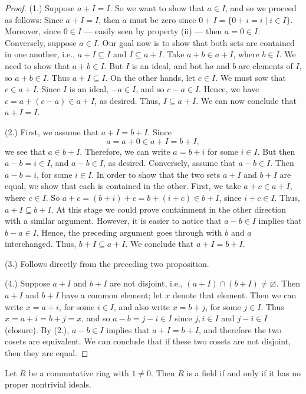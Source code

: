 \documentclass[graybox, reqno]{svmono}
\begin{document}
\begin{proof}
 (1.) Suppose $a+I = I$. So we want to show that $a \in I$, and so we proceed as follows: Since $a + I = I$, then $a$ must be zero since $0+I = \{ 0+ i = i \mid i \in I \}$. Moreover, since $0 \in I$ --- easily seen by property (ii) --- then $a= 0 \in I$. Conversely, suppose $a \in I$. Our goal now is to show that both sets are contained in one another, i.e., $a+I \subseteq I$ and $I \subseteq a + I$. Take $a + b \in a+ I$, where $b \in I$. We need to show that $a+ b \in I$. But $I$ is an ideal, and bot h$a$ and $b$ are elements of $I$, so $a+b \in I$. Thus $a+I \subseteq I$. On the other hands, let $c \in I$. We must sow that $c \in a +I$. Since $I$ is an ideal, $-a \in I$, and so $c-a \in I$. Hence, we have $c = a+ (c-a) \in a+I$, as desired. Thus, $I \subseteq a +I$. We can now conclude that $a+I =I$.

(2.) First, we assume that $a + I = b + I$. Since
\[ a = a + 0 \in a + I = b + I ,\]
we see that $a \in b + I$. Therefore, we can write $a = b + i$ for some $i \in I$. But then $a - b = i \in I$, and $a - b \in I$, as desired. Conversely, assume that $a - b \in I$. Then $a - b = i$, for some $i \in I$. In order to show that the two sets $a + I$ and $b + I$ are equal, we show that each is contained in the other. First, we take $a + c \in a + I$, where $c \in I$. So $a + c = (b + i) + c = b + (i + c) \in b + I$,
since $i + c \in I$. Thus, $a + I \subseteq b + I$. At this stage we could prove containment in the other direction with a similar argument. However, it is easier to notice that $a - b \in I$ implies that $b - a \in I$. Hence, the preceding argument goes through with $b$ and $a$ interchanged. Thus, $b + I \subseteq a + I$. We conclude that $a + I = b + I$. 

(3.) Follows directly from the preceding two proposition.

(4.) Suppose $a+I$ and $b+I$ are not disjoint, i.e., $(a+I) \cap (b+I) \neq \varnothing$. Then $a+ I$ and $b+I$ have a common element; let $x$ denote that element. Then we can write $x= a+i$, for some $i \in I$, and also write $x = b+j$, for some $j \in I$. Thus $x = a+i = b+j = x$, and so $a-b = j-i \in I $ since $j, i \in I$ and $j-i \in I$ (closure). By (2.), $a-b \in I$ implies that $a + I = b+I$, and therefore the two cosets are equivalent. We can conclude that if these two cosets are not disjoint, then they are equal. 
\end{proof}
\begin{proposition} Let $R$ be a commutative ring with $1 \neq 0$. Then $R$ is a field if and only if it has no proper nontrivial ideals.
\end{proposition} 
\end{document}
